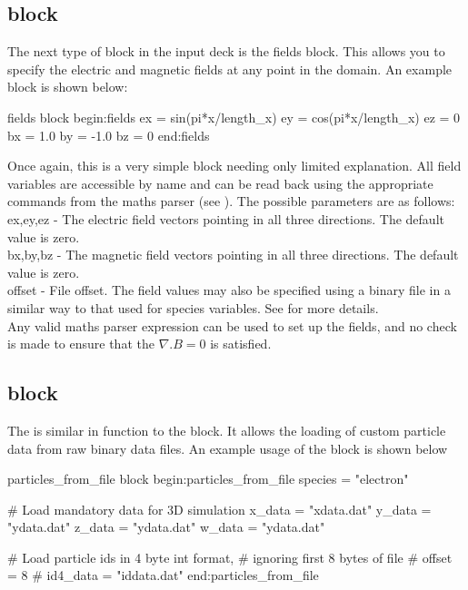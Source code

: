 \subsection{ block}
\label{sec:fields_block}
The next type of block in the {\EPOCH} input deck is the fields block. This
allows you to specify the electric and magnetic fields at any point in the
domain. An example block is shown below:
\begin{lboxverbatim}{fields block}
begin:fields
   ex = sin(pi*x/length_x)
   ey = cos(pi*x/length_x)
   ez = 0
   bx = 1.0
   by = -1.0
   bz = 0
end:fields
\end{lboxverbatim}

Once again, this is a very simple block needing only limited
explanation. All field variables are accessible by name and can be read back
using the appropriate commands from the maths parser (see ).
The possible parameters are as follows:\\

{\emphtext ex,\;ey,\;ez} - The electric field vectors pointing in all three
directions. The default value is zero.\\

{\emphtext bx,\;by,\;bz} - The magnetic field vectors pointing in all three
directions. The default value is zero.\\

{\emphtext offset} - File offset. The field values may also be specified using
a binary file in a similar way to that used for species variables. See
 for more details.\\

Any valid maths parser expression can be used to set up the fields, and no
check is made to ensure that the $\nabla.B = 0$ is satisfied.


\subsection{ block}
\label{sec:particles_from_file}
The  is similar in function to the
 block. It allows the loading of custom particle data from raw
binary data files. An example usage of the block is shown below
\begin{lboxverbatim}{particles\_from\_file block}
begin:particles_from_file
   species = "electron"

   # Load mandatory data for 3D simulation
   x_data = "xdata.dat"
   y_data = "ydata.dat"
   z_data = "ydata.dat"
   w_data = "ydata.dat"

   # Load particle ids in 4 byte int format,
   # ignoring first 8 bytes of file
   # offset = 8
   # id4_data = "iddata.dat"
end:particles_from_file
\end{lboxverbatim}

